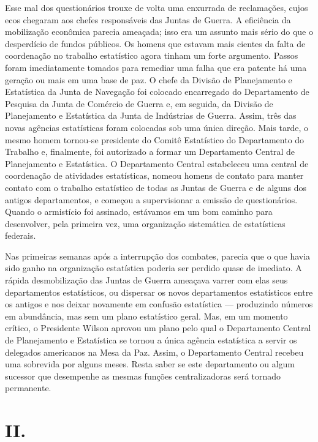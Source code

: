 \documentclass[12pt]{article}
\begin{document}
Esse mal dos questionários trouxe de volta uma enxurrada de reclamações, cujos ecos chegaram aos chefes responsáveis das Juntas de Guerra. A eficiência da mobilização econômica parecia ameaçada; isso era um assunto mais sério do que o desperdício de fundos públicos. Os homens que estavam mais cientes da falta de coordenação no trabalho estatístico agora tinham um forte argumento. Passos foram imediatamente tomados para remediar uma falha que era patente há uma geração ou mais em uma base de paz. O chefe da Divisão de Planejamento e Estatística da Junta de Navegação foi colocado encarregado do Departamento de Pesquisa da Junta de Comércio de Guerra e, em seguida, da Divisão de Planejamento e Estatística da Junta de Indústrias de Guerra. Assim, três das novas agências estatísticas foram colocadas sob uma única direção. Mais tarde, o mesmo homem tornou-se presidente do Comitê Estatístico do Departamento do Trabalho e, finalmente, foi autorizado a formar um Departamento Central de Planejamento e Estatística. O Departamento Central estabeleceu uma central de coordenação de atividades estatísticas, nomeou homens de contato para manter contato com o trabalho estatístico de todas as Juntas de Guerra e de alguns dos antigos departamentos, e começou a supervisionar a emissão de questionários. Quando o armistício foi assinado, estávamos em um bom caminho para desenvolver, pela primeira vez, uma organização sistemática de estatísticas federais.

Nas primeiras semanas após a interrupção dos combates, parecia que o que havia sido ganho na organização estatística poderia ser perdido quase de imediato. A rápida desmobilização das Juntas de Guerra ameaçava varrer com elas seus departamentos estatísticos, ou dispersar os novos departamentos estatísticos entre os antigos e nos deixar novamente em confusão estatística — produzindo números em abundância, mas sem um plano estatístico geral. Mas, em um momento crítico, o Presidente Wilson aprovou um plano pelo qual o Departamento Central de Planejamento e Estatística se tornou a única agência estatística a servir os delegados americanos na Mesa da Paz. Assim, o Departamento Central recebeu uma sobrevida por alguns meses. Resta saber se este departamento ou algum sucessor que desempenhe as mesmas funções centralizadoras será tornado permanente.

\section*{II.}
\end{document}
